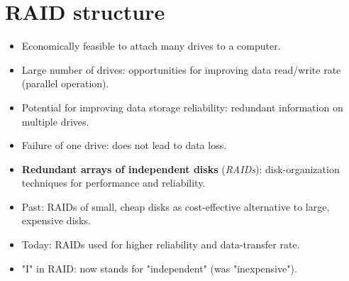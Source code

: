\section{RAID structure}

\begin{itemize}
    \item Economically feasible to attach many drives to a computer.
    \item Large number of drives: opportunities for improving data read/write rate (parallel operation).
    \item Potential for improving data storage reliability: redundant information on multiple drives.
    \item Failure of one drive: does not lead to data loss.
    \item \textbf{Redundant arrays of independent disks} (\textit{RAIDs}): disk-organization techniques for performance and reliability.
    \item Past: RAIDs of small, cheap disks as cost-effective alternative to large, expensive disks.
    \item Today: RAIDs used for higher reliability and data-transfer rate.
    \item "I" in RAID: now stands for "independent" (was "inexpensive").
\end{itemize}

